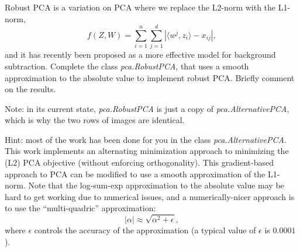 \documentclass{article}
\def\blu#1{{\color{blu}#1}}
\begin{document}
Robust PCA is a variation on PCA where we replace the L2-norm with the L1-norm,
\[
f(Z,W) = \sum_{i=1}^n\sum_{j=1}^d |\langle w^j, z_i\rangle - x_{ij}|,
\]
and it has recently been proposed as a more effective model for background subtraction. \blu{Complete the class \emph{pca.RobustPCA},
that uses a smooth approximation to the absolute value to implement robust PCA. Briefly comment on the results.} 

Note: in its current state, \emph{pca.RobustPCA} is just a copy of \emph{pca.AlternativePCA}, which is why the two rows of images are identical.

Hint: most of the work has been done for you in the class \emph{pca.AlternativePCA}.
This work implements an alternating minimization approach to minimizing the (L2) PCA objective (without enforcing orthogonality). This gradient-based approach to PCA can be modified to use a smooth approximation of the L1-norm. Note that the log-sum-exp approximation to the absolute value may be hard to get working due to numerical issues, and a numerically-nicer approach is to use the ``multi-quadric'' approximation:
\[
|\alpha| \approx \sqrt{\alpha^2 + \epsilon},
\]
where $\epsilon$ controls the accuracy of the approximation (a typical value of $\epsilon$ is $0.0001$).

\begin{center}
    
\end{center}
\end{document}
